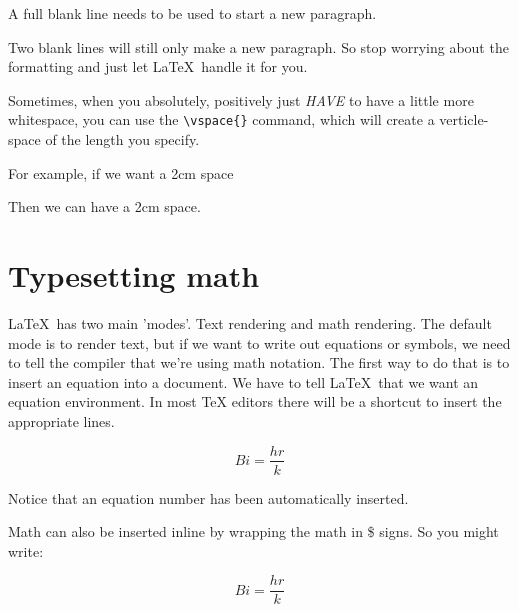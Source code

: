 \documentclass[12pt,a4paper]{article}
\begin{document}
  A full blank line needs to be used to start a new paragraph.  


  Two blank lines will still only make a new paragraph. So stop worrying
  about the formatting and just let \LaTeX\ handle it for you.  

  Sometimes, when you absolutely, positively just \textit{HAVE} to have
  a little more whitespace, you can use the \verb|\vspace{}| command,
  which will create a verticle-space of the length you specify.  

  For example, if we want a 2cm space

  \vspace{2cm}
 
  Then we can have a 2cm space.

\section{Typesetting math}
  \LaTeX\ has two main 'modes'.  Text
  rendering and math rendering.  The default mode is to render text, but
  if we want to write out equations or symbols, we need to tell the
  compiler that we're using math notation.  The first way to do that is
  to insert an equation into a document.
  We have to tell \LaTeX\ that we want an equation environment.  In most
  TeX editors there will be a shortcut to insert the appropriate
  lines.  

  \begin{equation}
    Bi = \frac{hr}{k}
    \label{eq:biotnumber}
  \end{equation}

  Notice that an equation number has been automatically inserted. 

  Math can also be inserted inline by wrapping the math in \$ signs. So
  you might write: 

  \begin{equation}
    Bi = \frac{hr}{k}
    \label{eq:biotnumber2}
  \end{equation}
\end{document}
